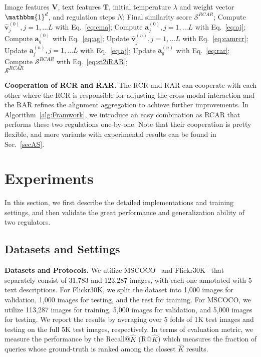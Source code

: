 \documentclass[journal]{IEEEtran}\newcommand{\ignore}[1]{}
\begin{document}
\begin{algorithm}[t!]
    \caption{Cooperation of RCR and RAR (RCAR)}
    \label{alg:Framwork}
    \begin{algorithmic}[1]
    \Require
        Image features $\boldsymbol{V}$, text features $\boldsymbol{T}$, initial temperature $\lambda$ and weight vector $\mathbbm{1}^{d}$, and regulation steps $N$;
    \Ensure
        Final similarity score $\mathcal{S}^{RCAR}$; 
    \State Compute $\hat{\boldsymbol{v}}_{j}^{(0)}, j=1,...L$ with Eq.~\eqref{eq:cma};
    \State Compute $\boldsymbol{a}_j^{(0)}, j=1,...L$ with Eq.~\eqref{eq:aj};
    \State Compute $\boldsymbol{a}_g^{(0)}$ with Eq.~\eqref{eq:ag};
    \State Update $\hat{\boldsymbol{v}}_j^{(n)}, j=1,...L$ with Eq.~\eqref{eq:camrcr};
    \State Update $\boldsymbol{a}_j^{(n)}, j=1,...L$ with Eq.~\eqref{eq:aj};
    \State Update $\boldsymbol{a}_g^{(n)}$ with Eq.~\eqref{eq:rar};
    \EndFor
    \State Compute $\mathcal{S}^{RCAR}$ with Eq.~\eqref{eq:st2iRAR};\\
    \Return $\mathcal{S}^{RCAR}$
    \end{algorithmic}
\end{algorithm}

{\bf Cooperation of RCR and RAR.}
\label{secRCAR}
The RCR and RAR can cooperate with each other where the RCR is responsible for adjusting the cross-modal interaction and the RAR refines the alignment aggregation to achieve further improvements. In Algorithm~\ref{alg:Framwork}, we introduce an easy combination as RCAR that performs these two regulations one-by-one. Note that their cooperation is pretty flexible, and more variants with experimental results can be found in Sec.~\ref{secAS}.

\section{Experiments}
In this section, we first describe the detailed implementations and training settings, and then validate the great performance and generalization ability of two regulators.

\subsection{Datasets and Settings}
\textbf{Datasets and Protocols.} We utilize MSCOCO~\cite{MSCOCO} and Flickr30K~\cite{Flickr30k} that separately consist of 31,783 and 123,287 images, with each one annotated with 5 text descriptions. 
For Flickr30K, we split the dataset into 1,000 images for validation, 1,000 images for testing, and the rest for training.
For MSCOCO, we utilize 113,287 images for training, 5,000 images for validation, and 5,000 images for testing. We report the results by averaging over 5 folds of 1K test images and testing on the full 5K test images, respectively. In terms of evaluation metric, we measure the performance by the Recall@$\hat{K}$ (R@$\hat{K}$) which measures the fraction of queries whose ground-truth is ranked among the closest $\hat{K}$ results.
\end{document}
